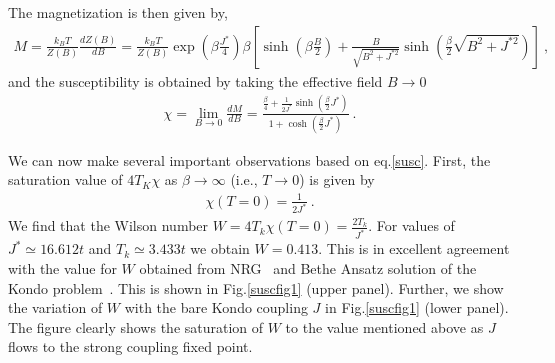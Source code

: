 \documentclass[aps,prb,preprint,groupedaddress]{revtex4-2}
\begin{document}
The magnetization is then given by,
\begin{eqnarray}
M=\frac{k_{B}T}{Z(B)}\frac{dZ(B)}{dB}=\frac{k_{B}T}{Z(B)}\exp(\beta\frac{J^{*}}{4})\beta\left[\sinh(\beta\frac{B}{2})
+\frac{B}{\sqrt{B^{2}+J^{*2}}}\sinh(\frac{\beta}{2}\sqrt{B^{2}+J^{*2}})\right]~,
\end{eqnarray}
and the susceptibility is obtained by taking the effective field $B\to 0$
\begin{eqnarray}
\chi=\lim_{B\to 0}\frac{dM}{dB}=\frac{\frac{\beta}{4}+\frac{1}{2J^{*}}\sinh(\frac{\beta}{2}J^{*})}{1+\cosh(\frac{\beta}{2}J^{*})}~.
\label{susc}
\end{eqnarray}
\par\noindent
We can now make several important observations based on eq.\ref{susc}. First, the saturation value of $4T_{K}\chi$ as $\beta\to \infty$ (i.e., $T\to 0$) is given by
\begin{eqnarray}
\chi(T=0)=\frac{1}{2J^{*}}~.
\end{eqnarray}
We find that the Wilson number $W=4T_{k}\chi(T=0)=\frac{2T_{k}}{J^{*}}$. For values of $J^{*}\simeq 16.612t$ and $T_{k}\simeq 3.433t$ we obtain $W=0.413$. This is in excellent agreement with the value for $W$ obtained from NRG~\cite{bullaNRGreview} and Bethe Ansatz solution of the Kondo problem~\cite{andreiKondoreview,tsvelickKondoreview}. This is shown in Fig.\ref{suscfig1} (upper panel). Further, we show the variation of $W$ with the bare Kondo coupling $J$ in Fig.\ref{suscfig1} (lower panel). The figure clearly shows the saturation of $W$ to the value mentioned above as $J$ flows to the strong coupling fixed point.
\end{document}
